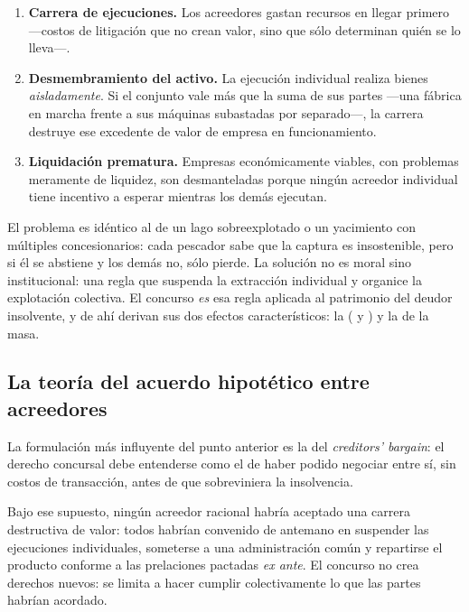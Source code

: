 \begin{enumerate}
  \item \textbf{Carrera de ejecuciones.} Los acreedores gastan recursos en llegar primero
  ---costos de litigación que no crean valor, sino que sólo determinan quién se lo lleva---.

  \item \textbf{Desmembramiento del activo.} La ejecución individual realiza bienes
  \emph{aisladamente}. Si el conjunto vale más que la suma de sus partes ---una fábrica en marcha
  frente a sus máquinas subastadas por separado---, la carrera destruye ese excedente de valor de
  empresa en funcionamiento.

  \item \textbf{Liquidación prematura.} Empresas económicamente viables, con problemas meramente de
  liquidez, son desmanteladas porque ningún acreedor individual tiene incentivo a esperar mientras
  los demás ejecutan.
\end{enumerate}

\begin{foco}
El problema es idéntico al de un lago sobreexplotado o un yacimiento con múltiples concesionarios:
cada pescador sabe que la captura es insostenible, pero si él se abstiene y los demás no, sólo
pierde. La solución no es moral sino institucional: una regla que suspenda la extracción individual
y organice la explotación colectiva. El concurso \emph{es} esa regla aplicada al patrimonio del
deudor insolvente, y de ahí derivan sus dos efectos característicos: la
 ( y ) y la
 de la masa.
\end{foco}

\subsection{La teoría del acuerdo hipotético entre acreedores}

La formulación más influyente del punto anterior es la del \emph{creditors' bargain}: el derecho
concursal debe entenderse como el  de haber
podido negociar entre sí, sin costos de transacción, antes de que sobreviniera la insolvencia.

Bajo ese supuesto, ningún acreedor racional habría aceptado una carrera destructiva de valor: todos
habrían convenido de antemano en suspender las ejecuciones individuales, someterse a una
administración común y repartirse el producto conforme a las prelaciones pactadas
\emph{ex ante}. El concurso no crea derechos nuevos: se limita a hacer cumplir colectivamente lo
que las partes habrían acordado.

